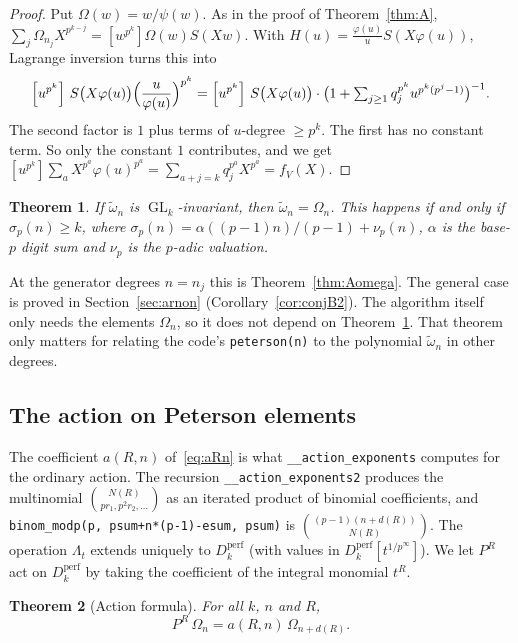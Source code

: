 \documentclass[11pt]{amsart}
\newtheorem{theorem}{Theorem}[section]
\theoremstyle{definition}
\theoremstyle{remark}
\newcommand{\Dperf}{D_k^{\mathrm{perf}}}
\newcommand{\wt}{\widetilde{\omega}}
\newcommand{\code}[1]{\texttt{#1}}
\newcommand{\coef}[1]{\left[#1\right]}
\DeclareMathOperator{\GL}{GL}
\begin{document}
\begin{proof}
Put $\Omega(w)=w/\psi(w)$.  As in the proof of Theorem~\ref{thm:A},
$\sum_j\Omega_{n_j}X^{p^{k-j}}=\coef{w^{p^k}}\Omega(w)S(Xw)$.  With
$H(u)=\frac{\varphi(u)}{u}S(X\varphi(u))$, Lagrange inversion turns this into
\[
  \coef{u^{p^k}}\,S\bigl(X\varphi(u)\bigr)\Bigl(\frac{u}{\varphi(u)}\Bigr)^{p^k}
  =\coef{u^{p^k}}\,S\bigl(X\varphi(u)\bigr)\cdot\bigl(1+\textstyle\sum_{j\ge1}q_j^{p^k}u^{p^k(p^j-1)}\bigr)^{-1}.
\]
The second factor is $1$ plus terms of $u$-degree $\ge p^k$.  The first has no
constant term.  So only the constant $1$ contributes, and we get
$\coef{u^{p^k}}\sum_aX^{p^a}\varphi(u)^{p^a}=\sum_{a+j=k}q_j^{p^a}X^{p^a}=f_V(X)$.
\end{proof}

\begin{theorem}\label{conj:B}
If $\wt_n$ is $\GL_k$-invariant, then $\wt_n=\Omega_n$.  This happens if and
only if $\sigma_p(n)\ge k$, where
$\sigma_p(n)=\alpha((p-1)n)/(p-1)+\nu_p(n)$, $\alpha$ is the base-$p$ digit sum
and $\nu_p$ is the $p$-adic valuation.
\end{theorem}

At the generator degrees $n=n_j$ this is Theorem~\ref{thm:Aomega}.  The general
case is proved in Section~\ref{sec:arnon} (Corollary~\ref{cor:conjB2}).  The
algorithm itself only needs the elements $\Omega_n$, so it does not depend on
Theorem~\ref{conj:B}.  That theorem only matters for relating the code's
\code{peterson(n)} to the polynomial $\wt_n$ in other degrees.

\subsection{The action on Peterson elements}
The coefficient $a(R,n)$ of~\eqref{eq:aRn} is what
\code{\_\_action\_exponents} computes for the ordinary action.  The recursion
\code{\_\_action\_exponents2} produces the multinomial
$\binom{N(R)}{pr_1,p^2r_2,\dots}$ as an iterated product of binomial
coefficients, and \code{binom\_modp(p, psum+n*(p-1)-esum, psum)} is
$\binom{(p-1)(n+d(R))}{N(R)}$.  The operation $\Lambda_t$ extends uniquely to
$\Dperf$ (with values in $\Dperf[t^{1/p^\infty}]$).  We let $P^R$ act on
$\Dperf$ by taking the coefficient of the integral monomial $t^R$.

\begin{theorem}[Action formula]\label{thm:C}
For all $k$, $n$ and $R$,
\[
  P^R\,\Omega_n=a(R,n)\,\Omega_{n+d(R)} .
\]
\end{theorem}
\end{document}
